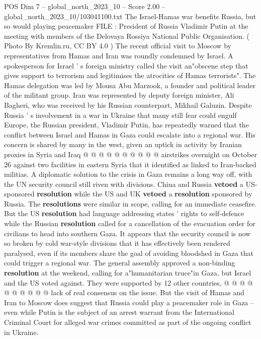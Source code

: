 \begin{textsample}{POS Dim 7 – global\_north\_2023\_10 – Score 2.00 – global\_north\_2023\_10/103041100.txt}  \label{ex:f7_pos_428}
The Israel-Hamas war benefits Russia, but so would playing peacemaker FILE : President of Russia Vladimir Putin at the meeting with members of the Delovaya Rossiya National Public Organisation. ( Photo By Kremlin.ru, CC BY 4.0 ) The recent official visit to Moscow by representatives from Hamas and Iran was roundly condemned by Israel.
A spokesperson for Israel ' s foreign ministry called the visit an"obscene step that gives support to terrorism and legitimises the atrocities of Hamas terrorists".
The Hamas delegation was led by Mousa Abu Marzook, a founder and political leader of the militant group.
Iran was represented by deputy foreign minister, Ali Bagheri, who was received by his Russian counterpart, Mikhail Galuzin.
Despite Russia ' s involvement in a war in Ukraine that many still fear could engulf Europe, the Russian president, Vladimir Putin, has repeatedly warned that the conflict between Israel and Hamas in Gaza could escalate into a regional war.
His concern is shared by many in the west, given an uptick in activity by Iranian proxies in Syria and Iraq @ @ @ @ @ @ @ @ @ @ airstrikes overnight on October 26 against two facilities in eastern Syria that it identified as linked to Iran-backed militias.
A diplomatic solution to the crisis in Gaza remains a long way off, with the UN security council still riven with divisions.
China and Russia \textbf{vetoed} a US-sponsored \textbf{resolution} while the US and UK \textbf{vetoed} a \textbf{resolution} sponsored by Russia.
The \textbf{resolutions} were similar in scope, calling for an immediate ceasefire.
But the US \textbf{resolution} had language addressing states ' rights to self-defence while the Russian \textbf{resolution} called for a cancellation of the evacuation order for civilians to head into southern Gaza.
It appears that the security council is now so broken by cold war-style divisions that it has effectively been rendered paralysed, even if its members share the goal of avoiding bloodshed in Gaza that could trigger a regional war.
The general assembly approved a non-binding \textbf{resolution} at the weekend, calling for a"humanitarian truce"in Gaza, but Israel and the US voted against.
They were supported by 12 other countries, @ @ @ @ @ @ @ @ @ @ lack of real consensus on the issue.
But the visit of Hamas and Iran to Moscow does suggest that Russia could play a peacemaker role in Gaza -- even while Putin is the subject of an arrest warrant from the International Criminal Court for alleged war crimes committed as part of the ongoing conflict in Ukraine.

\end{textsample}
